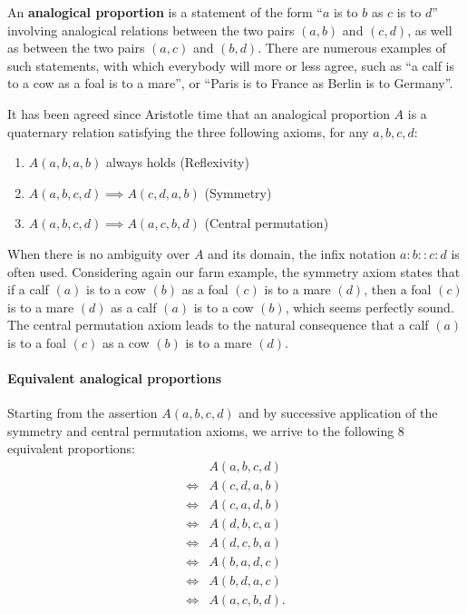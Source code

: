 An \textbf{analogical proportion} is a statement of the form ``$a$ is to $b$ as
$c$ is to $d$'' involving analogical relations between the two pairs $(a,b)$ and
$(c,d)$, as well as between the two pairs $(a,c)$ and $(b,d)$.  There are numerous
examples of such statements, with which everybody will more or less agree, such
as  ``a calf is to a cow as a foal is to a mare'', or ``Paris is to France as
Berlin is to Germany''.

It has been agreed since Aristotle time that an analogical proportion $A$ is a
quaternary relation satisfying the three following axioms, for any $a, b, c, d$:

\begin{enumerate}
\item $A(a,b,a,b)$ always holds (Reflexivity)
\item $A(a,b,c,d) \implies A(c,d,a,b)$ (Symmetry)
\item $A(a,b,c,d) \implies A(a,c,b,d)$ (Central permutation)
\end{enumerate}

When there is no ambiguity over $A$ and its domain, the infix notation
$a:b::c:d$ is often used. Considering again our farm example, the symmetry
axiom states that if a calf $(a)$ is to a cow $(b)$ as a foal $(c)$ is to a
mare $(d)$, then a foal $(c)$ is to a mare $(d)$ as a calf $(a)$ is to a cow
$(b)$, which seems perfectly sound. The central permutation axiom leads to the
natural consequence that a calf $(a)$ is to a foal $(c)$ as a cow $(b)$ is to a
mare $(d)$.

\paragraph{Equivalent analogical proportions\\}
Starting from the assertion $A(a, b, c, d)$ and by successive application of
the symmetry and central permutation axioms, we arrive to the following $8$
equivalent proportions:
\begin{align*}
       &A(a, b, c, d)\\
  \iff &A(c, d, a, b)\\
  \iff &A(c, a, d, b)\\
  \iff &A(d, b, c, a)\\
  \iff &A(d, c, b, a)\\
  \iff &A(b, a, d, c)\\
  \iff &A(b, d, a, c)\\
  \iff &A(a, c, b, d).
\end{align*}

